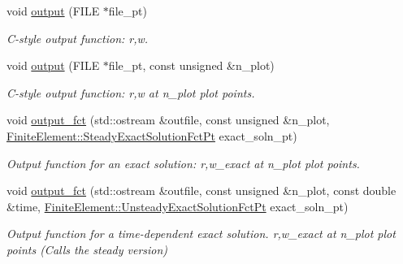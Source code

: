 \begin{DoxyCompactItemize}
void \hyperlink{classoomph_1_1AxisymFoepplvonKarmanElement_a17a94d66cf74c7be11d8e0a514db1d92}{output} (F\+I\+LE $\ast$file\+\_\+pt)
\begin{DoxyCompactList}\small\item\em C-\/style output function\+: r,w. \end{DoxyCompactList}\item 
void \hyperlink{classoomph_1_1AxisymFoepplvonKarmanElement_a09a7d0ec1c8c495c7703e6c034d8eafc}{output} (F\+I\+LE $\ast$file\+\_\+pt, const unsigned \&n\+\_\+plot)
\begin{DoxyCompactList}\small\item\em C-\/style output function\+: r,w at n\+\_\+plot plot points. \end{DoxyCompactList}\item 
void \hyperlink{classoomph_1_1AxisymFoepplvonKarmanElement_aee745c3439aa18c82ddbe8b90fade1c0}{output\+\_\+fct} (std\+::ostream \&outfile, const unsigned \&n\+\_\+plot, \hyperlink{classoomph_1_1FiniteElement_a690fd33af26cc3e84f39bba6d5a85202}{Finite\+Element\+::\+Steady\+Exact\+Solution\+Fct\+Pt} exact\+\_\+soln\+\_\+pt)
\begin{DoxyCompactList}\small\item\em Output function for an exact solution\+: r,w\+\_\+exact at n\+\_\+plot plot points. \end{DoxyCompactList}\item 
void \hyperlink{classoomph_1_1AxisymFoepplvonKarmanElement_a290c4391d1da3688805466cf2852a93e}{output\+\_\+fct} (std\+::ostream \&outfile, const unsigned \&n\+\_\+plot, const double \&time, \hyperlink{classoomph_1_1FiniteElement_ad4ecf2b61b158a4b4d351a60d23c633e}{Finite\+Element\+::\+Unsteady\+Exact\+Solution\+Fct\+Pt} exact\+\_\+soln\+\_\+pt)
\begin{DoxyCompactList}\small\item\em Output function for a time-\/dependent exact solution. r,w\+\_\+exact at n\+\_\+plot plot points (Calls the steady version) \end{DoxyCompactList}\end{DoxyCompactItemize}
